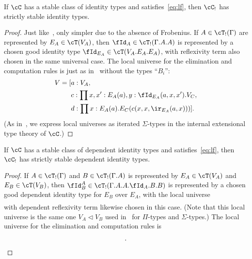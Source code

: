 \documentclass{amsart}
\let\C\cC
\let\T\cT
\let\r\ir
\let\Id\fId
\begin{document}
\begin{thm}
  If $\C$ has a stable class of identity types and satisfies~\eqref{eq:lf}, then $\C_!$ has strictly stable identity types.
\end{thm}
\begin{proof}
  Just like~\cite[Theorem 3.4.3.2]{lw:localuniv}, only simpler due to the absence of Frobenius.
  If $A\in\T_!(\Gamma)$ are represented by $E_A\in\T(V_A)$, then $\Id_A\in\T_!(\Gamma.A.A)$ is represented by a chosen good identity type $\Id_{E_A}\in \T(V_A.E_A.E_A)$, with reflexivity term also chosen in the same universal case.
  The local universe for the elimination and computation rules is just as in~\cite[Theorem 3.4.3.2]{lw:localuniv} without the types ``$B_i$'':
  \begin{align*}
    V = [ & a:V_A, \\
    & c:\prod x,x':E_A(a), y:\Id_{E_A}(a,x,x'). V_C,\\
    & d:\prod x:E_A(a). E_C(c(x,x,\r_{E_A}(a,x)))].
  \end{align*}
  (As in~\cite{lw:localuniv}, we express local universes as iterated $\Sigma$-types in the internal extensional type theory of $\C$.)
\end{proof}

\begin{thm}
  If $\C$ has a stable class of dependent identity types and satisfies~\eqref{eq:lf}, then $\C_!$ has strictly stable dependent identity types.
\end{thm}
\begin{proof}
  If $A\in\T_!(\Gamma)$ and $B\in\T_!(\Gamma.A)$ is represented by $E_A\in\T(V_A)$ and $E_B\in\T(V_B)$, then $\Id^A_B\in\T_!(\Gamma.A.A.\Id_A.B.B)$ is represented by a chosen good dependent identity type for $E_B$ over $E_A$, with the local universe
  \begin{align*}
    [ a:V_A, b: (V_B)^{E_A(a)} ]
  \end{align*}
  with dependent reflexivity term likewise chosen in this case.
  (Note that this local universe is the same one $V_A \triangleleft V_B$ used in~\cite{lw:localuniv} for $\Pi$-types and $\Sigma$-types.)
  The local universe for the elimination and computation rules is
  \begin{align*}
    [ & a:V_A, \\
    & b:\prod x:E_A(a). V_B,\\
    & c:\prod x,x':E_A(a), y:\Id_{E_A}(a,x,x'), u:E_B(b(x)), u':E_B(b(x')), z:\Id^{E_A}_{E_B}(a,x,x',y,b,u,u'). V_C,\\
    & d:\prod x:E_A(a), u:E_B(b(x)) . E_C(c(x,x,\r_{E_A}(a,x),u,u,\r^{E_A}_{E_B}(a,x,u)))].\qedhere
  \end{align*}
\end{proof}
\end{document}
